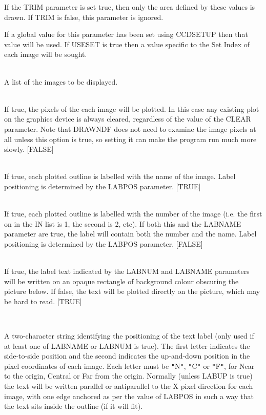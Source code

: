 \documentclass[twoside,11pt]{article}
\renewcommand{\_}{\texttt{\symbol{95}}}
\newcommand{\routine}[1]{{\sc #1}}
\newcommand{\sstsubsection}[1]{ \item[{#1}] \mbox{} \\}
\newcommand{\sstsubsection}[1]{\item[{#1}]}
\begin{document}
{{{         If the TRIM parameter is set true, then only the area defined
         by these values is drawn.  If TRIM is false, this parameter
         is ignored.

         If a global value for this parameter has been set using
         \routine{CCDSETUP} then that value will be used.  If USESET is true
         then a value specific to the Set Index of each image will
         be sought.
      }
      \sstsubsection{
         IN = LITERAL (Read)
      }{
         A list of the images to be displayed.
      }
      \sstsubsection{
         IMAGE = \_LOGICAL (Read)
      }{
         If true, the pixels of the each image will be plotted.
         In this case any existing plot on the graphics device is
         always cleared, regardless of the value of the CLEAR parameter.
         Note that \routine{DRAWNDF} does not need to examine the image pixels
         at all unless this option is true, so setting it can make
         the program run much more slowly.
         [FALSE]
      }
      \sstsubsection{
         LABNAME = \_LOGICAL (Read)
      }{
         If true, each plotted outline is labelled with the name of
         the image.  Label positioning is determined by the LABPOS
         parameter.
         [TRUE]
      }
      \sstsubsection{
         LABNUM = \_LOGICAL (Read)
      }{
         If true, each plotted outline is labelled with the number of
         the image (i.e. the first on in the IN list is 1, the second
         is 2, etc).  If both this and the LABNAME parameter are true,
         the label will contain both the number and the name.
         Label positioning is determined by the LABPOS parameter.
         [FALSE]
      }
      \sstsubsection{
         LABOPAQUE = \_LOGICAL (Read)
      }{
         If true, the label text indicated by the LABNUM and LABNAME
         parameters will be written on an opaque rectangle of background
         colour obscuring the picture below.  If false, the text will
         be plotted directly on the picture, which may be hard to read.
         [TRUE]
      }
      \sstsubsection{
         LABPOS = LITERAL (Read)
      }{
         A two-character string identifying the positioning of the text
         label (only used if at least one of LABNAME or LABNUM is
         true).  The first letter indicates the side-to-side
         position and the second indicates the up-and-down position
         in the pixel coordinates of each image.  Each letter must be
         {\tt "}N{\tt "}, {\tt "}C{\tt "} or {\tt "}F{\tt "}, for Near to the origin, Central or Far from
         the origin.  Normally (unless LABUP is true) the text
         will be written parallel or antiparallel to the X pixel
         direction for each image, with one edge anchored as per the
         value of LABPOS in such a way that the text sits inside the
         outline (if it will fit).

}}}
\end{document}
